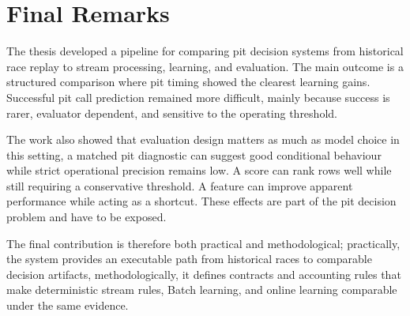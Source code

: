 \section{Final Remarks}

The thesis developed a pipeline for comparing pit decision systems from historical race replay to stream processing, learning, and evaluation. The main outcome is a
structured comparison where pit timing showed the clearest learning gains. Successful pit call prediction remained more difficult, mainly
because success is rarer, evaluator dependent, and sensitive to the operating threshold.

The work also showed that evaluation design matters as much as model choice in this setting, a matched pit diagnostic can suggest good conditional behaviour while strict
operational precision remains low. A score can rank rows well while still requiring a conservative threshold. A feature can improve apparent performance while acting as a
shortcut. These effects are part of the pit decision problem and have to be exposed.

The final contribution is therefore both practical and methodological; practically, the system provides an executable path from historical races to comparable decision artifacts,
methodologically, it defines contracts and accounting rules that make deterministic stream rules, Batch learning, and online learning comparable under the same evidence.